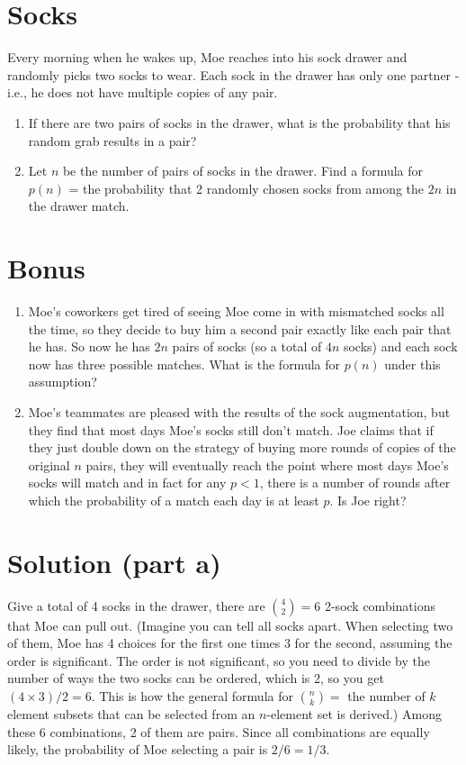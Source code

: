 \documentclass[11pt,a4paper]{report}
\theoremstyle{plain}
\theoremstyle{definition}
\theoremstyle{remark}
\begin{document}
\section*{Socks}
Every morning when he wakes up, Moe reaches into his sock drawer and randomly picks two socks to wear. Each sock in the drawer has only one partner - i.e., he does not have multiple copies of any pair.
\begin{enumerate}[label=(\alph*)]
\item If there are two pairs of socks in the drawer, what is the probability that his random grab results in a pair?
\item Let $n$ be the number of pairs of socks in the drawer.  Find a formula for $p(n)$ = the probability that 2 randomly chosen socks from among the $2n$ in the drawer match.
\end{enumerate}
\section*{Bonus}
\begin{enumerate}[label=(\alph*)]\addtocounter{enumi}{2}
\item Moe's coworkers get tired of seeing Moe come in with mismatched socks all the time, so they decide to buy him a second pair exactly like each pair that he has. So now he has $2n$ pairs of socks (so a total of $4n$ socks) and each sock now has three possible matches.  What is the formula for $p(n)$ under this assumption?
\item Moe's teammates are pleased with the results of the sock augmentation, but they find that most days Moe's socks still don't match.  Joe claims that if they just double down on the strategy of buying more rounds of copies of the original $n$ pairs, they will eventually reach the point where most days Moe's socks will match and in fact for any $p < 1$, there is a number of rounds after which the probability of a match each day is at least $p.$  Is Joe right? 
\end{enumerate}

\newpage
\section*{Solution (part a)}
Give a total of 4 socks in the drawer, there are ${4 \choose 2} = 6$ 2-sock combinations that Moe can pull out. (Imagine you can tell all socks apart. When selecting two of them, Moe has 4 choices for the first one times 3 for the second, assuming the order is significant.  The order is not significant,  so you need to divide by the number of ways the two socks can be ordered, which is 2, so you get $({4 \times 3})/2 = 6$.  This is how the general formula for ${n \choose k} =$ the number of $k$ element subsets that can be selected from an $n$-element set is derived.)  Among these 6 combinations, 2 of them are pairs. Since all combinations are equally likely, the probability of Moe selecting a pair is $2/6 = 1/3.$
\end{document}
